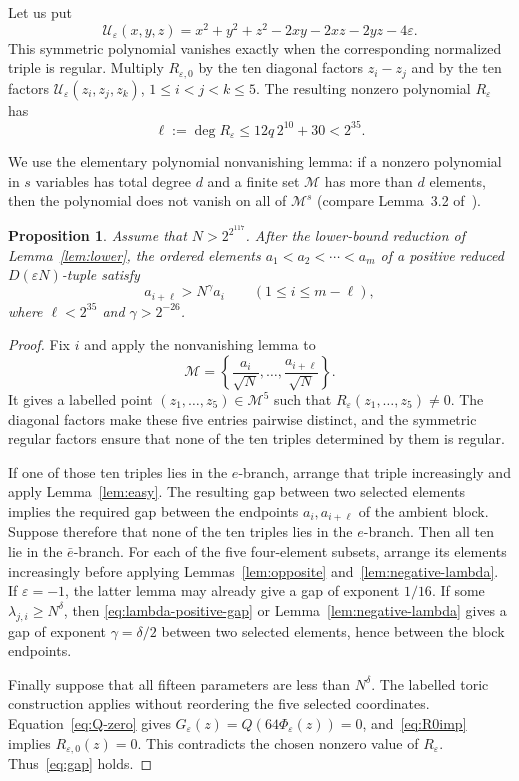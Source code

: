 \documentclass[11pt]{amsart}
\newtheorem{proposition}[theorem]{Proposition}
\theoremstyle{remark}
\newcommand{\eps}{\varepsilon}
\begin{document}
Let us put
\[
 \mathcal U_\eps(x,y,z)
 =x^2+y^2+z^2-2xy-2xz-2yz-4\eps.
\]
This symmetric polynomial vanishes exactly when the corresponding normalized
triple is regular. Multiply $R_{\eps,0}$ by the ten diagonal factors
$z_i-z_j$ and by the ten factors
$\mathcal U_\eps(z_i,z_j,z_k)$, $1\le i<j<k\le5$. The resulting nonzero
polynomial $R_\eps$ has
\begin{equation}
 \ell:=\deg R_\eps\le12q\,2^{10}+30<2^{35}.
\end{equation}

We use the elementary polynomial nonvanishing lemma: if a nonzero polynomial
in $s$ variables has total degree $d$ and a finite set $\mathcal M$ has more
than $d$ elements, then the polynomial does not vanish on all of
$\mathcal M^s$ (compare Lemma~3.2 of~\cite{DL}).

\begin{proposition}%
\label{prop:gap}
Assume that $N>2^{2^{117}}$. After the lower-bound reduction of
Lemma~\ref{lem:lower}, the ordered elements
$a_1<a_2<\cdots<a_m$ of a positive reduced $D(\eps N)$-tuple satisfy
\begin{equation}\label{eq:gap}
 a_{i+\ell}>N^\gamma a_i
 \qquad(1\le i\le m-\ell),
\end{equation}
where $\ell<2^{35}$ and $\gamma>2^{-26}$.
\end{proposition}

\begin{proof}
Fix $i$ and apply the nonvanishing lemma to
\[
 \mathcal M=
 \left\{\frac{a_i}{\sqrt N},\ldots,
 \frac{a_{i+\ell}}{\sqrt N}\right\}.
\]
It gives a labelled point $(z_1,\ldots,z_5)\in\mathcal M^5$ such that
$R_\eps(z_1,\ldots,z_5)\ne0$. The diagonal factors make these five entries
pairwise distinct, and the symmetric regular factors ensure that none of the
ten triples determined by them is regular.

If one of those ten triples lies in the $e$-branch, arrange that triple
increasingly and apply Lemma~\ref{lem:easy}. The resulting gap between two
selected elements implies the required gap between the endpoints
$a_i,a_{i+\ell}$ of the ambient block. Suppose therefore that none of the
ten triples lies in the $e$-branch. Then all ten lie in the $\bar e$-branch.
For each of the five four-element subsets, arrange its elements increasingly
before applying Lemmas~\ref{lem:opposite} and~\ref{lem:negative-lambda}.
If $\eps=-1$, the latter lemma may already give a gap of exponent $1/16$.
If some $\lambda_{j,i}\ge N^\delta$, then
\eqref{eq:lambda-positive-gap} or Lemma~\ref{lem:negative-lambda} gives a
gap of exponent $\gamma=\delta/2$ between two selected elements, hence
between the block endpoints.

Finally suppose that all fifteen parameters are less than $N^\delta$.
The labelled toric construction applies without reordering the five selected
coordinates. Equation~\eqref{eq:Q-zero} gives
$G_\eps(z)=Q(64\Phi_\eps(z))=0$, and~\eqref{eq:R0imp} implies
$R_{\eps,0}(z)=0$. This contradicts the chosen nonzero value of $R_\eps$.
Thus~\eqref{eq:gap} holds.
\end{proof}
\end{document}

